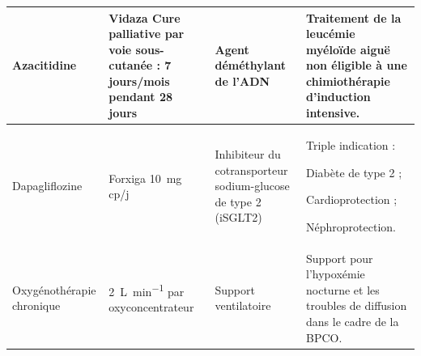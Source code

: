 \begin{landscape}
\begin{ThreePartTable}
\begin{xltabular}{\linewidth}{|L{3.9cm}|L{3.9cm}|L{5.8cm}|Y|}
    Azacitidine &
    Vidaza \newline Cure palliative par voie sous-cutanée : 7 jours/mois pendant 28 jours &
    Agent déméthylant de l'ADN &
    Traitement de la leucémie myéloïde aiguë non éligible à une chimiothérapie d'induction intensive. \\
    \hline

    Dapagliflozine &
    Forxiga \qty{10}{\mg}  cp/j &
    Inhibiteur du cotransporteur sodium-glucose de type 2 (iSGLT2) &
    Triple indication :
    \begin{tableitemize}
      \item Diabète de type 2 ;
      \item Cardioprotection ;
      \item Néphroprotection.
    \end{tableitemize} \\
    \hline

    Oxygénothérapie chronique &
    \qty{2}{\L\per\minute} par oxyconcentrateur &
    Support ventilatoire &
    Support pour l'hypoxémie nocturne et les troubles de diffusion dans le cadre de la BPCO. \\
  \end{xltabular}
\end{ThreePartTable}
\endgroup
\end{landscape}
